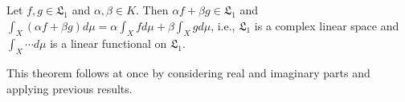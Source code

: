 Let $f, g \in \mathfrak{L}_1$ and $\alpha, \beta \in K$. Then $\alpha f + \beta g \in \mathfrak{L}_1$ and $\int_X (\alpha f + \beta g) d\mu = \alpha \int_X f d\mu + \beta \int_X g d\mu$, i.e., $\mathfrak{L}_1$ is a complex linear space and $\int_X \cdots d\mu$ is a linear functional on $\mathfrak{L}_1$.

This theorem follows at once by considering real and imaginary parts and applying previous results.